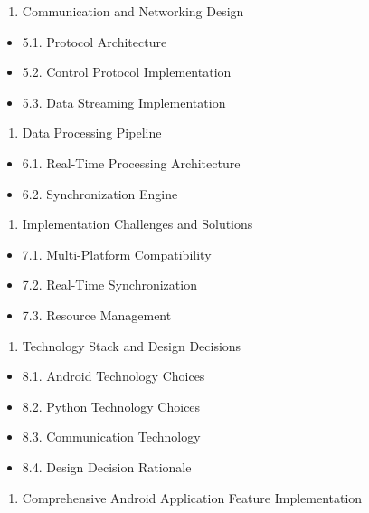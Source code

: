 \documentclass[12pt,a4paper]{report}
\begin{document}
\begin{enumerate}
\item Communication and Networking Design
\end{enumerate}
\begin{itemize}
\item 5.1. Protocol Architecture
\item 5.2. Control Protocol Implementation
\item 5.3. Data Streaming Implementation
\end{itemize}
\begin{enumerate}
\item Data Processing Pipeline
\end{enumerate}
\begin{itemize}
\item 6.1. Real-Time Processing Architecture
\item 6.2. Synchronization Engine
\end{itemize}
\begin{enumerate}
\item Implementation Challenges and Solutions
\end{enumerate}
\begin{itemize}
\item 7.1. Multi-Platform Compatibility
\item 7.2. Real-Time Synchronization
\item 7.3. Resource Management
\end{itemize}
\begin{enumerate}
\item Technology Stack and Design Decisions
\end{enumerate}
\begin{itemize}
\item 8.1. Android Technology Choices
\item 8.2. Python Technology Choices
\item 8.3. Communication Technology
\item 8.4. Design Decision Rationale
\end{itemize}
\begin{enumerate}
\item Comprehensive Android Application Feature Implementation
\end{enumerate}
\end{document}
